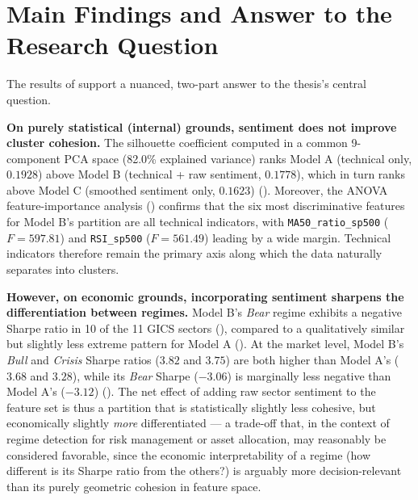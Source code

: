 \section{Main Findings and Answer to the Research Question}
\label{sec:concl-findings}

The results of  support a nuanced, two-part answer to the
thesis's central question.

\textbf{On purely statistical (internal) grounds, sentiment does not
improve cluster cohesion.} The silhouette coefficient computed in a common
9-component PCA space (82.0\% explained variance) ranks Model A
(technical only, $0.1928$) above Model B (technical + raw sentiment,
$0.1778$), which in turn ranks above Model C (smoothed sentiment only,
$0.1623$) (). Moreover, the ANOVA
feature-importance analysis () confirms that
the six most discriminative features for Model B's partition are all
technical indicators, with \texttt{MA50\_ratio\_sp500} ($F=597.81$) and
\texttt{RSI\_sp500} ($F=561.49$) leading by a wide margin. Technical
indicators therefore remain the primary axis along which the data
naturally separates into clusters.

\textbf{However, on economic grounds, incorporating sentiment sharpens the
differentiation between regimes.} Model B's \emph{Bear} regime exhibits a
negative Sharpe ratio in 10 of the 11 GICS sectors
(), compared to a qualitatively similar but
slightly less extreme pattern for Model A
(). At the market level, Model B's
\emph{Bull} and \emph{Crisis} Sharpe ratios ($3.82$ and $3.75$) are both
higher than Model A's ($3.68$ and $3.28$), while its \emph{Bear} Sharpe
($-3.06$) is marginally less negative than Model A's ($-3.12$)
(). The net effect of adding raw sector sentiment
to the feature set is thus a partition that is statistically slightly less
cohesive, but economically slightly \emph{more} differentiated --- a
trade-off that, in the context of regime detection for risk management or
asset allocation, may reasonably be considered favorable, since the
economic interpretability of a regime (how different is its Sharpe ratio
from the others?) is arguably more decision-relevant than its purely
geometric cohesion in feature space.

